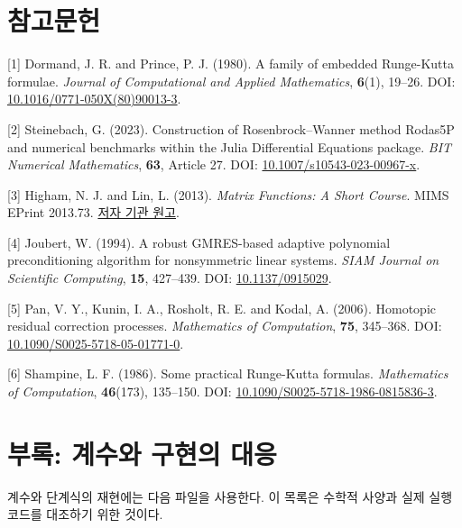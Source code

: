 \documentclass[
  10pt,
  dvipsnames]{article}
\begin{document}
\hypertarget{uxcc38uxace0uxbb38uxd5cc}{%
\section{참고문헌}\label{uxcc38uxace0uxbb38uxd5cc}}

{[}1{]} Dormand, J. R. and Prince, P. J. (1980). A family of embedded
Runge-Kutta formulae. \emph{Journal of Computational and Applied
Mathematics}, \textbf{6}(1), 19--26. DOI:
\href{https://doi.org/10.1016/0771-050X(80)90013-3}{10.1016/0771-050X(80)90013-3}.

{[}2{]} Steinebach, G. (2023). Construction of Rosenbrock--Wanner method
Rodas5P and numerical benchmarks within the Julia Differential Equations
package. \emph{BIT Numerical Mathematics}, \textbf{63}, Article 27. DOI:
\href{https://doi.org/10.1007/s10543-023-00967-x}{10.1007/s10543-023-00967-x}.

{[}3{]} Higham, N. J. and Lin, L. (2013). \emph{Matrix Functions: A
Short Course}. MIMS EPrint 2013.73.
\href{https://eprints.maths.manchester.ac.uk/2067/1/paper.pdf}{저자 기관
원고}.

{[}4{]} Joubert, W. (1994). A robust GMRES-based adaptive polynomial
preconditioning algorithm for nonsymmetric linear systems. \emph{SIAM
Journal on Scientific Computing}, \textbf{15}, 427--439. DOI:
\href{https://doi.org/10.1137/0915029}{10.1137/0915029}.

{[}5{]} Pan, V. Y., Kunin, I. A., Rosholt, R. E. and Kodal, A. (2006).
Homotopic residual correction processes. \emph{Mathematics of
Computation}, \textbf{75}, 345--368. DOI:
\href{https://doi.org/10.1090/S0025-5718-05-01771-0}{10.1090/S0025-5718-05-01771-0}.

{[}6{]} Shampine, L. F. (1986). Some practical Runge-Kutta formulas.
\emph{Mathematics of Computation}, \textbf{46}(173), 135--150. DOI:
\href{https://doi.org/10.1090/S0025-5718-1986-0815836-3}{10.1090/S0025-5718-1986-0815836-3}.


\hypertarget{uxbd80uxb85d-uxacc4uxc218uxc640-uxad6cuxd604uxc758-uxb300uxc751}{%
\section{부록: 계수와 구현의
대응}\label{uxbd80uxb85d-uxacc4uxc218uxc640-uxad6cuxd604uxc758-uxb300uxc751}}

계수와 단계식의 재현에는 다음 파일을 사용한다. 이 목록은 수학적 사양과
실제 실행 코드를 대조하기 위한 것이다.
\end{document}
